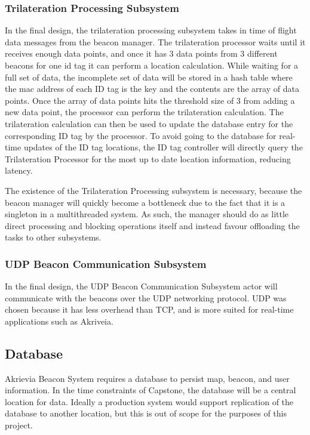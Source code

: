 \subsubsection{Trilateration Processing Subsystem}
\medskip
In the final design, the trilateration processing subsystem takes in time of flight data messages from the beacon manager.
The trilateration processor waits until it receives enough data points, and once it has 3 data points from 3 different beacons for one id tag it can perform a location calculation.
While waiting for a full set of data, the incomplete set of data will be stored in a hash table where the mac address of each ID tag is the key and the contents are the array of data points.
Once the array of data points hits the threshold size of 3 from adding a new data point, the processor can perform the trilateration calculation.
The trilateration calculation can then be used to update the database entry for the corresponding ID tag by the processor.
To avoid going to the database for real-time updates of the ID tag locations, the ID tag controller will directly query the Trilateration Processor for the most up to date location information, reducing latency.

\bigskip
The existence of the Trilateration Processing subsystem is necessary, because the beacon manager will quickly become a bottleneck due to the fact that it is a singleton in a multithreaded system.
As such, the manager should do as little direct processing and blocking operations itself and instead favour offloading the tasks to other subsystems.

\medskip
\subsubsection{UDP Beacon Communication Subsystem}
\medskip
In the final design, the UDP Beacon Communication Subsystem actor will communicate with the beacons over the UDP networking protocol.
UDP was chosen because it has less overhead than TCP, and is more suited for real-time applications such as Akriveia.

\medskip
\subsection{Database}
\medskip
Akrievia Beacon System requires a database to persist map, beacon, and user information.
In the time constraints of Capstone, the database will be a central location for data.
Ideally a production system would support replication of the database to another location, but this is out of scope for the purposes of this project.

